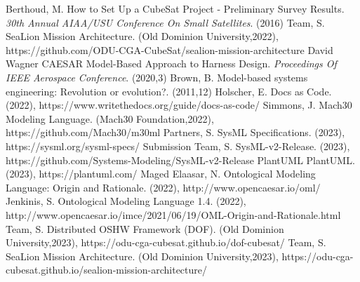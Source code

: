 \begin{thebibliography}{999}
    Berthoud, M. How to Set Up a CubeSat Project - Preliminary Survey Results. {\em 30th Annual AIAA/USU Conference On Small Satellites}. (2016)
    Team, S. SeaLion Mission Architecture. (Old Dominion University,2022), https://github.com/ODU-CGA-CubeSat/sealion-mission-architecture
    David Wagner CAESAR Model-Based Approach to Harness Design. {\em Proceedings Of IEEE Aerospace Conference}. (2020,3)
    Brown, B. Model-based systems engineering: Revolution or evolution?.  (2011,12)
    Holscher, E. Docs as Code.  (2022), https://www.writethedocs.org/guide/docs-as-code/
    Simmons, J. Mach30 Modeling Language. (Mach30 Foundation,2022), https://github.com/Mach30/m30ml
    Partners, S. SysML Specifications.  (2023), https://sysml.org/sysml-specs/
    Submission Team, S. SysML-v2-Release.  (2023), https://github.com/Systems-Modeling/SysML-v2-Release
    PlantUML PlantUML.  (2023), https://plantuml.com/
    Maged Elaasar, N. Ontological Modeling Language: Origin and Rationale.  (2022), http://www.opencaesar.io/oml/
    Jenkinis, S. Ontological Modeling Language 1.4.  (2022), http://www.opencaesar.io/imce/2021/06/19/OML-Origin-and-Rationale.html
    Team, S. Distributed OSHW Framework (DOF). (Old Dominion University,2023), https://odu-cga-cubesat.github.io/dof-cubesat/
    Team, S. SeaLion Mission Architecture. (Old Dominion University,2023), https://odu-cga-cubesat.github.io/sealion-mission-architecture/
\end{thebibliography}